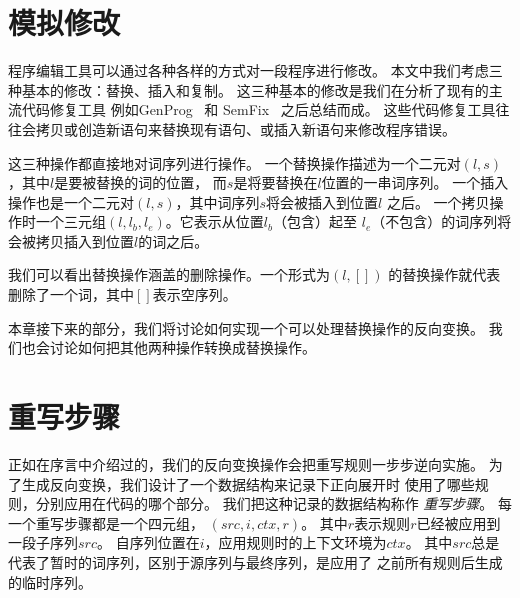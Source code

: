 
\section{模拟修改}\label{sec:changes}
程序编辑工具可以通过各种各样的方式对一段程序进行修改。
本文中我们考虑三种基本的修改：替换、插入和复制。
这三种基本的修改是我们在分析了现有的主流代码修复工具
例如GenProg~\parencite{le2012genprog} 和 SemFix~\parencite{nguyen2013semfix}
之后总结而成。
这些代码修复工具往往会拷贝或创造新语句来替换现有语句、或插入新语句来修改程序错误。

这三种操作都直接地对词序列进行操作。
一个替换操作描述为一个二元对$(l, s)$，其中$l$是要被替换的词的位置，
而$s$是将要替换在$l$位置的一串词序列。
一个插入操作也是一个二元对$(l, s)$，其中词序列$s$将会被插入到位置$l$
之后。
一个拷贝操作时一个三元组$(l, l_b, l_e)$。它表示从位置$l_b$（包含）起至
$l_e$（不包含）的词序列将会被拷贝插入到位置$l$的词之后。

我们可以看出替换操作涵盖的删除操作。一个形式为$(l, [])$
的替换操作就代表删除了一个词，其中$[]$表示空序列。

本章接下来的部分，我们将讨论如何实现一个可以处理替换操作的反向变换。
我们也会讨论如何把其他两种操作转换成替换操作。

\section{重写步骤}\label{sec:steps}
正如在序言中介绍过的，我们的反向变换操作会把重写规则一步步逆向实施。
为了生成反向变换，我们设计了一个数据结构来记录下正向展开时
使用了哪些规则，分别应用在代码的哪个部分。
我们把这种记录的数据结构称作 \emph{重写步骤}。
每一个重写步骤都是一个四元组， $(src, i, ctx, r)$。
其中$r$表示规则$r$已经被应用到一段子序列$src$。
自序列位置在$i$，应用规则时的上下文环境为$ctx$。
其中$src$总是代表了暂时的词序列，区别于源序列与最终序列，是应用了
之前所有规则后生成的临时序列。

